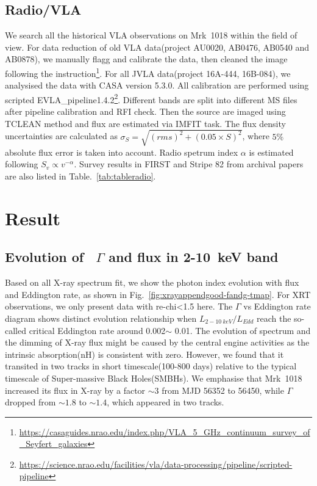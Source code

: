 \documentclass{aastex63}
\newcommand{\Gammaxray}{$\Gamma$}
\begin{document}
\subsection{Radio/VLA}
We search all the historical VLA observations on Mrk~1018 within the field of view. For data reduction of old VLA data(project AU0020, AB0476, AB0540 and AB0878), we manually flagg and calibrate the data, then cleaned the image following the instruction\footnote{\url{https://casaguides.nrao.edu/index.php/VLA_5_GHz_continuum_survey_of_Seyfert_galaxies}}. For all JVLA data(project 16A-444, 16B-084),  we analysised the data with CASA version 5.3.0\citep{2007ASPC..376..127M}. All calibration are performed using scripted EVLA\_pipeline1.4.2\footnote{\url{https://science.nrao.edu/facilities/vla/data-processing/pipeline/scripted-pipeline}}. Different bands are split into different MS files after pipeline calibration and RFI check. Then the source are imaged using TCLEAN method and flux are estimated via IMFIT task. The flux density uncertainties are calculated as $\sigma_{S}=\sqrt{(rms)^2+(0.05\times S)^2}$, where $5\%$ absolute flux error is taken into account. Radio spetrum index $\alpha$ is estimated following $S_v \propto v^{-\alpha}$. Survey results in FIRST\citep{1994ASPC...61..165B,1995ApJ...450..559B} and Stripe 82\citep{2011AJ....142....3H} from archival papers are also listed in Table.~\ref{tab:tableradio}.

\section{Result}
\label{sec:result}

\subsection{Evolution of ~\texorpdfstring{\Gammaxray} . and flux in 2-10~keV band\label{subsec:g-f}}

Based on all X-ray spectrum fit, we show the photon index evolution with flux and Eddington rate, as shown in Fig.~\ref{fig:xrayappendgood-fandg-tmap}. For XRT observations, we only present data with re-chi<1.5 here. The $\Gamma$ vs Eddington rate diagram shows distinct evolution relationship when $L_{2-10~ keV}/L_{Edd}$ reach the so-called critical Eddington rate around 0.002$\sim$ 0.01. The evolution of spectrum and the dimming of X-ray flux might be caused by the central engine activities as the intrinsic absorption(nH) is consistent with zero. However, we found that it transited in two tracks in short timescale(100-800 days) relative to the typical timescale of Super-massive Black Holes(SMBHs). We emphasise that Mrk~1018 increased its flux in X-ray by a factor $\sim3$ from MJD 56352 to 56450, while $\Gamma$ dropped from $\sim1.8$ to $\sim1.4$, which appeared in two tracks. 
\end{document}
